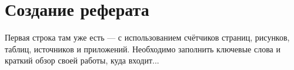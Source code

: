 \section{Создание реферата}

Первая строка там уже есть --- с использованием счётчиков страниц, рисунков, таблиц, источников и приложений. Необходимо заполнить ключевые слова и краткий обзор своей работы, куда входит...
